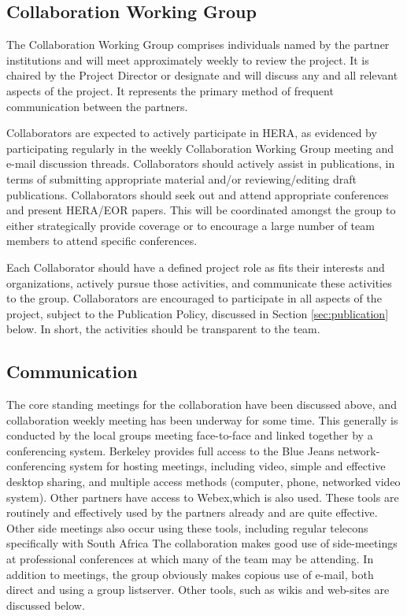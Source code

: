 \documentclass[preprint]{aastex}
\begin{document}
\subsection{Collaboration Working Group}
The Collaboration Working Group comprises individuals named by the partner
institutions and will meet approximately weekly to review the project. It is chaired
by the Project Director or designate and will discuss any and all relevant aspects of
the project. It represents the primary method of frequent communication between the
partners.

Collaborators are expected to actively participate in HERA, as evidenced by participating
regularly in the weekly Collaboration Working Group meeting and e-mail discussion
threads.  Collaborators should actively assist in publications, in terms of submitting
appropriate material and/or reviewing/editing draft publications.  Collaborators should
seek out and attend appropriate conferences and present HERA/EOR papers.  This will
be coordinated amongst the group to either strategically provide coverage or to encourage 
a large number of team members to attend specific conferences.

Each Collaborator should have a defined project role as fits their interests and organizations,
actively pursue those activities, and communicate these activities to the group.  Collaborators
are encouraged to participate in all aspects of the project, subject to the Publication Policy, 
discussed in Section \ref{sec:publication} below.  In short, the activities should be transparent
to the team.

\subsection{Communication}
The core standing meetings for the collaboration have been discussed above, and
collaboration weekly meeting has been underway for some time. This generally is
conducted by the local groups meeting face-to-face and linked together by a
conferencing system. Berkeley provides full access to the Blue Jeans
network-conferencing system for hosting meetings, including video, simple and
effective desktop sharing, and multiple access methods (computer, phone, networked
video system). Other partners have access to Webex,which is also used. These tools
are routinely and effectively used by the partners already and are quite effective.
Other side meetings also occur using these tools, including regular telecons
specifically with South Africa The collaboration makes good use of side-meetings at
professional conferences at which many of the team may be attending.
In addition to meetings, the group obviously makes copious use of e-mail, both direct 
and using a group listserver.  Other tools, such as wikis and web-sites are discussed below.
\end{document}

